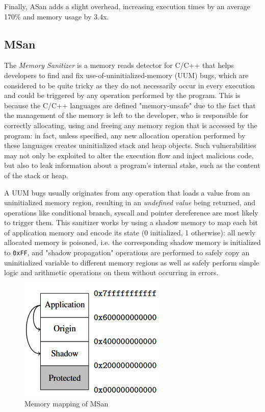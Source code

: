 Finally, ASan adds a slight overhead, increasing execution times by an average 170\% and memory usage by 3.4x. \cite{serebryany2012addresssanitizer}





\subsection{MSan}
The \textit{Memory Sanitizer} \cite{stepanov2015memorysanitizer} is a memory reads detector for C/C++ that helps developers to find and fix use-of-uninitialized-memory (UUM) bugs, which are considered to be quite tricky as they do not necessarily occur in every execution and could be triggered by any operation performed by the program. This is because the C/C++ languages are defined "memory-unsafe" due to the fact that the management of the memory is left to the developer, who is responsible for correctly allocating, using and freeing any memory region that is accessed by the program: in fact, unless specified, any new allocation operation performed by these languages creates uninitialized stack and heap objects. Such vulnerabilities may not only be exploited to alter the execution flow and inject malicious code, but also to leak information about a program's internal stake, such as the content of the stack or heap.

A UUM bugs usually originates from any operation that loads a value from an uninitialized memory region, resulting in an \textit{undefined value} being returned, and operations like conditional branch, syscall and pointer dereference are most likely to trigger them. This sanitizer works by using a shadow memory to map each bit of application memory and encode its state (0 initialized, 1 otherwise): all newly allocated memory is poisoned, i.e. the corresponding shadow memory is initialized to \verb|0xFF|, and "shadow propagation" operations are performed to safely copy an uninitialized variable to different memory regions as well as safely perform simple logic and arithmetic operations on them without occurring in errors.

\begin{figure}[h]
\centering
\includegraphics[scale=0.8]{foto/shadow_memory_2.png}
\caption{Memory mapping of MSan \cite{stepanov2015memorysanitizer}}
\label{fig:msan_shadow}
\end{figure}

